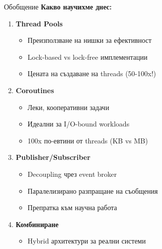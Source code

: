 \documentclass[aspectratio=169]{beamer}
\begin{document}
\begin{frame}{Обобщение}
\textbf{Какво научихме днес:}

\begin{enumerate}
    \item \textbf{Thread Pools}
    \begin{itemize}
        \item Преизползване на нишки за ефективност
        \item Lock-based vs lock-free имплементации
        \item Цената на създаване на threads (50-100x!)
    \end{itemize}
    
    \item \textbf{Coroutines}
    \begin{itemize}
        \item Леки, кооперативни задачи
        \item Идеални за I/O-bound workloads
        \item 100x по-евтини от threads (KB vs MB)
    \end{itemize}
    
    \item \textbf{Publisher/Subscriber}
    \begin{itemize}
        \item Decoupling чрез event broker
        \item Паралелизирано разпращане на съобщения
        \item Препратка към научна работа
    \end{itemize}
    
    \item \textbf{Комбиниране}
    \begin{itemize}
        \item Hybrid архитектури за реални системи
    \end{itemize}
\end{enumerate}
\end{frame}
\end{document}
